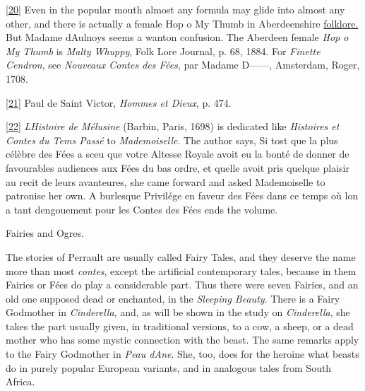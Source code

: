 \documentclass[14pt,a4paper]{memoir}
\newcommand{\ul}[1]{\uline{#1}}
\begin{document}
\protect\hypertarget{4533318093929944247_33931-h-0.htm.xhtmlux5cux23Footnote_20}{}{}
\protect\hyperlink{4533318093929944247_33931-h-0.htm.xhtmlux5cux23FNanchor_20}{{{[}20{]}}}
Even in the popular mouth almost any formula may glide into almost any
other, and there is actually a female Hop o\textquotesingle{} My Thumb
in Aberdeenshire \ul{folklore.} But Madame
d\textquotesingle Aulnoy\textquotesingle s seems a wanton confusion. The
Aberdeen female \emph{Hop o\textquotesingle{} My Thumb} is \emph{Malty
Whuppy}, Folk Lore Journal, p. 68, 1884. For \emph{Finette Cendron}, see
\emph{Nouveaux Contes des Fées}, par Madame D------, Amsterdam, Roger,
1708.

\protect\hypertarget{4533318093929944247_33931-h-0.htm.xhtmlux5cux23Footnote_21}{}{}
\protect\hyperlink{4533318093929944247_33931-h-0.htm.xhtmlux5cux23FNanchor_21}{{{[}21{]}}}
Paul de Saint Victor, \emph{Hommes et Dieux}, p. 474.

\protect\hypertarget{4533318093929944247_33931-h-0.htm.xhtmlux5cux23Footnote_22}{}{}
\protect\hyperlink{4533318093929944247_33931-h-0.htm.xhtmlux5cux23FNanchor_22}{{{[}22{]}}}
\emph{L\textquotesingle Histoire de Mélusine} (Barbin, Paris, 1698) is
dedicated like \emph{Histoires et Contes du Tems Passé} to
\emph{Mademoiselle}. The author says, \textquotesingle Si tost que la
plus célèbre des Fées a sceu que votre Altesse Royale avoit eu la bonté
de donner de favourables audiences aux Fées du bas ordre, et
qu\textquotesingle elle avoit pris quelque plaisir au recit de leurs
avanteures,\textquotesingle{} she came forward and asked Mademoiselle to
patronise her own. A burlesque \textquotesingle Privilége en faveur des
Fées dans ce temps où l\textquotesingle on a tant
d\textquotesingle engouement pour les Contes des Fées\textquotesingle{}
ends the volume.

{Fairies and Ogres.}

The stories of Perrault are usually called \textquotesingle Fairy
Tales,\textquotesingle{} and they deserve the name more than most
\emph{contes}, except the artificial contemporary tales, because in them
Fairies or Fées do play a considerable part. Thus there were seven
Fairies, and an old one \textquotesingle supposed dead or
enchanted,\textquotesingle{} in the \emph{Sleeping Beauty}. There is a
Fairy Godmother in \emph{Cinderella}, and, as will be shown in the study
on \emph{Cinderella}, she takes the part usually given, in traditional
versions, to a cow, a sheep, or a dead mother who has some mystic
connection with the beast. The same remarks apply to the Fairy Godmother
in \emph{Peau d\textquotesingle Ane}. She, too, does for the heroine
what beasts do in purely popular European variants, and in analogous
tales from South Africa.
\end{document}
